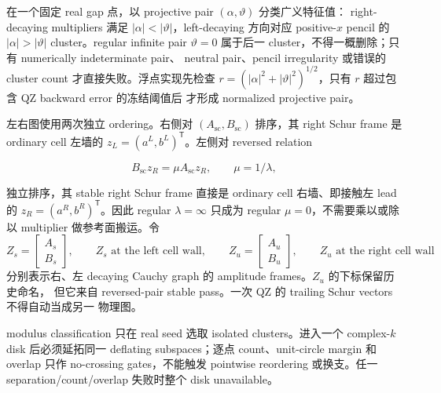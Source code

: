 \documentclass[UTF8,fontset=fandol,11pt,a4paper]{ctexart}
\begin{document}
在一个固定 real gap 点，以 projective pair $(\alpha,\vartheta)$ 分类广义特征值：
right-decaying multipliers 满足 $|\alpha|<|\vartheta|$，left-decaying 方向对应
positive-$x$ pencil 的 $|\alpha|>|\vartheta|$ cluster。regular infinite pair
$\vartheta=0$ 属于后一 cluster，不得一概删除；只有 numerically indeterminate pair、
neutral pair、pencil irregularity 或错误的 cluster count 才直接失败。浮点实现先检查
$r=(|\alpha|^2+|\vartheta|^2)^{1/2}$，只有 $r$ 超过包含 QZ backward error 的冻结阈值后
才形成 normalized projective pair。

左右图使用两次独立 ordering。右侧对 $(A_{\mathrm{sc}},B_{\mathrm{sc}})$ 排序，其
right Schur frame 是 ordinary cell 左墙的
$z_L=(a^L,b^L)^{\mathsf T}$。左侧对 reversed relation

\[
  B_{\mathrm{sc}}z_R=\mu A_{\mathrm{sc}}z_R,
  \qquad \mu=1/\lambda,
\]

独立排序，其 stable right Schur frame 直接是 ordinary cell 右墙、即接触左 lead 的
$z_R=(a^R,b^R)^{\mathsf T}$。因此 regular $\lambda=\infty$ 只成为 regular
$\mu=0$，不需要乘以或除以 multiplier 做参考面搬运。令
\[
  Z_s=\begin{bmatrix}A_s\\B_s\end{bmatrix},
  \qquad Z_s\text{ at the left cell wall},
  \qquad
  Z_u=\begin{bmatrix}A_u\\B_u\end{bmatrix},
  \qquad Z_u\text{ at the right cell wall}
\]
分别表示右、左 decaying Cauchy graph 的 amplitude frames。$Z_u$ 的下标保留历史命名，
但它来自 reversed-pair stable pass。一次 QZ 的 trailing Schur vectors 不得自动当成另一
物理图。

modulus classification 只在 real seed 选取 isolated clusters。进入一个 complex-$k$
disk 后必须延拓同一 deflating subspaces；逐点 count、unit-circle margin 和 overlap 只作
no-crossing gates，不能触发 pointwise reordering 或换支。任一 separation/count/overlap
失败时整个 disk unavailable。
\end{document}
